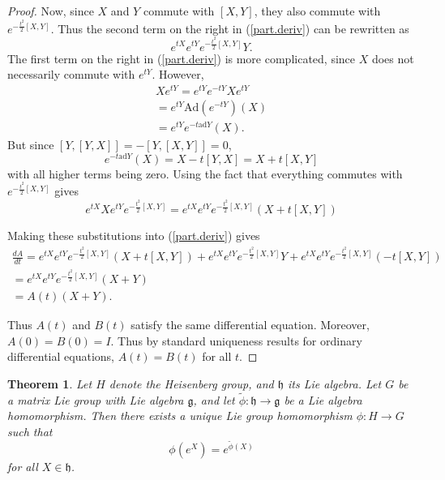 \documentclass{amsbook}
\let \frak = \mathfrak
\theoremstyle{plain}
\newtheorem{theorem}{Theorem}
\numberwithin{equation}{chapter}
\numberwithin{theorem}{chapter}
\begin{document}
\begin{proof}
Now, since $X$ and $Y$ commute with $\left[  X,Y\right]  $, they also commute
with $e^{-\frac{t^{2}}{2}\left[  X,Y\right]  }$. Thus the second term on the
right in (\ref{part.deriv}) can be rewritten as
\[
e^{tX}e^{tY}e^{-\frac{t^{2}}{2}\left[  X,Y\right]  }Y\text{.}%
\]
The first term on the right in (\ref{part.deriv}) is more complicated, since
$X$ does not necessarily commute with $e^{tY}$. However,
\begin{align*}
Xe^{tY}=e^{tY}e^{-tY}Xe^{tY}\\
=e^{tY}\mathrm{Ad}\left(  e^{-tY}\right)  \left(  X\right)  \\
=e^{tY}e^{-t\mathrm{ad}Y}\left(  X\right)  \text{.}%
\end{align*}
But since $\left[  Y,\left[  Y,X\right]  \right]  =-\left[  Y,\left[
X,Y\right]  \right]  =0$,
\[
e^{-t\mathrm{ad}Y}\left(  X\right)  =X-t\left[  Y,X\right]  =X+t\left[
X,Y\right]
\]
with all higher terms being zero. Using the fact that everything commutes with
$e^{-\frac{t^{2}}{2}\left[  X,Y\right]  }$ gives
\[
e^{tX}Xe^{tY}e^{-\frac{t^{2}}{2}\left[  X,Y\right]  }=e^{tX}e^{tY}%
e^{-\frac{t^{2}}{2}\left[  X,Y\right]  }\left(  X+t\left[  X,Y\right]
\right)
\]

Making these substitutions into (\ref{part.deriv}) gives
\begin{align*}
\frac{dA}{dt}=e^{tX}e^{tY}e^{-\frac{t^{2}}{2}\left[  X,Y\right]  }\left(
X+t\left[  X,Y\right]  \right)  +e^{tX}e^{tY}e^{-\frac{t^{2}}{2}\left[
X,Y\right]  }Y+e^{tX}e^{tY}e^{-\frac{t^{2}}{2}\left[  X,Y\right]  }\left(
-t\left[  X,Y\right]  \right)  \\
=e^{tX}e^{tY}e^{-\frac{t^{2}}{2}\left[  X,Y\right]  }\left(  X+Y\right)  \\
=A\left(  t\right)  \left(  X+Y\right)  \text{.}%
\end{align*}

Thus $A\left(  t\right)  $ and $B\left(  t\right)  $ satisfy the same
differential equation. Moreover, $A\left(  0\right)  =B\left(  0\right)  =I$.
Thus by standard uniqueness results for ordinary differential equations,
$A\left(  t\right)  =B\left(  t\right)  $ for all $t$.
\end{proof}

\begin{theorem}
Let $H$ denote the Heisenberg group, and $\frak{h}$ its Lie algebra. Let $G$
be a matrix Lie group with Lie algebra $\frak{g}$, and let $\widetilde{\phi
}:\frak{h}\rightarrow\frak{g}$ be a Lie algebra homomorphism. Then there
exists a unique Lie group homomorphism $\phi:H\rightarrow G$ such that
\[
\phi\left(  e^{X}\right)  =e^{\widetilde{\phi}\left(  X\right)  }%
\]
for all $X\in\frak{h}$.
\end{theorem}
\end{document}
